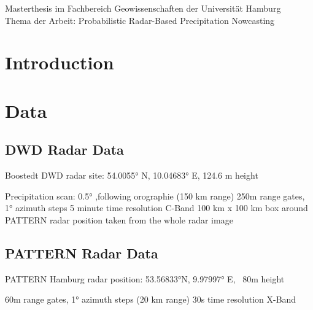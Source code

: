 \documentclass[11pt,twoside,a4paper,fleqn]{report}
\numberwithin{equation}{chapter}
\numberwithin{figure}{chapter}
\numberwithin{table}{chapter}
\begin{document}
	\newpage
	\thispagestyle{empty}
	\null
	\vfill
	Masterthesis im Fachbereich Geowissenschaften der Universität Hamburg\\
	Thema der Arbeit: \glqq Probabilistic Radar-Based Precipitation Nowcasting\grqq
	
	
\newpage
\renewcommand{\abstractname}{\huge \flushleft Abstract}
\begin{abstract}
\null
\end{abstract}
\thispagestyle{empty}
\pagestyle{empty}
\tableofcontents
\listoffigures
\listoftables
\newpage\pagestyle{fancy}
\chapter{Introduction}
\chapter{Data}
\section{DWD Radar Data}
Boostedt DWD radar site: 54.0055° N, 10.04683° E, 124.6 m height

Precipitation scan: 0.5° ,following orographie (150 km range)
250m range gates, 1° azimuth steps
5 minute time resolution
C-Band
100 km x 100 km box around PATTERN radar position taken from the whole radar image
\section{PATTERN Radar Data}
PATTERN Hamburg radar position: 53.56833°N, 9.97997° E, ~80m height

60m range gates, 1° azimuth steps (20 km range)
30s time resolution
X-Band
\end{document}
